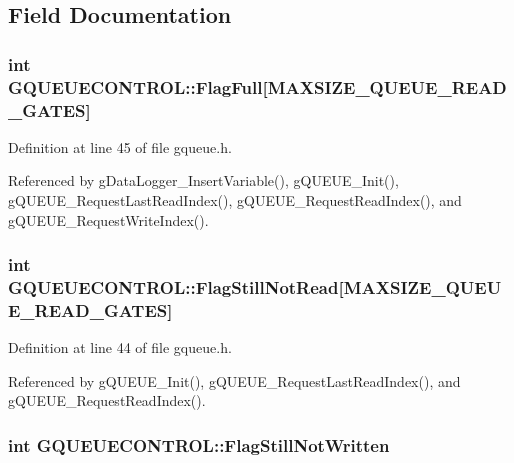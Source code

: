 \subsection{Field Documentation}
\hypertarget{structGQUEUECONTROL_a5f54a26afa8554ed2f161b83aba14f5c}{
\subsubsection[{Flag\-Full}]{\setlength{\rightskip}{0pt plus 5cm}int G\-Q\-U\-E\-U\-E\-C\-O\-N\-T\-R\-O\-L\-::\-Flag\-Full\mbox{[}{\bf M\-A\-X\-S\-I\-Z\-E\-\_\-\-Q\-U\-E\-U\-E\-\_\-\-R\-E\-A\-D\-\_\-\-G\-A\-T\-E\-S}\mbox{]}}}\label{structGQUEUECONTROL_a5f54a26afa8554ed2f161b83aba14f5c}


Definition at line 45 of file gqueue.\-h.



Referenced by g\-Data\-Logger\-\_\-\-Insert\-Variable(), g\-Q\-U\-E\-U\-E\-\_\-\-Init(), g\-Q\-U\-E\-U\-E\-\_\-\-Request\-Last\-Read\-Index(), g\-Q\-U\-E\-U\-E\-\_\-\-Request\-Read\-Index(), and g\-Q\-U\-E\-U\-E\-\_\-\-Request\-Write\-Index().

\hypertarget{structGQUEUECONTROL_a9336a08f0410235b38b78638b0e3f882}{
\subsubsection[{Flag\-Still\-Not\-Read}]{\setlength{\rightskip}{0pt plus 5cm}int G\-Q\-U\-E\-U\-E\-C\-O\-N\-T\-R\-O\-L\-::\-Flag\-Still\-Not\-Read\mbox{[}{\bf M\-A\-X\-S\-I\-Z\-E\-\_\-\-Q\-U\-E\-U\-E\-\_\-\-R\-E\-A\-D\-\_\-\-G\-A\-T\-E\-S}\mbox{]}}}\label{structGQUEUECONTROL_a9336a08f0410235b38b78638b0e3f882}


Definition at line 44 of file gqueue.\-h.



Referenced by g\-Q\-U\-E\-U\-E\-\_\-\-Init(), g\-Q\-U\-E\-U\-E\-\_\-\-Request\-Last\-Read\-Index(), and g\-Q\-U\-E\-U\-E\-\_\-\-Request\-Read\-Index().

\hypertarget{structGQUEUECONTROL_a4d58bdb6b0dc93bb6034c4209b6e7915}{
\subsubsection[{Flag\-Still\-Not\-Written}]{\setlength{\rightskip}{0pt plus 5cm}int G\-Q\-U\-E\-U\-E\-C\-O\-N\-T\-R\-O\-L\-::\-Flag\-Still\-Not\-Written}}\label{structGQUEUECONTROL_a4d58bdb6b0dc93bb6034c4209b6e7915}


